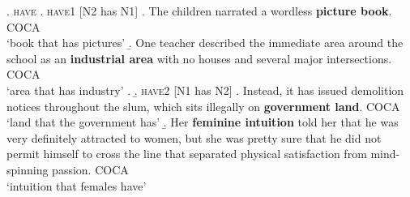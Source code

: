 \ex. \textsc{have}
\a. \textsc{have1} [N2 has N1]
\a. \label{ex:picture_book}%
 The children narrated a wordless \textbf{picture book}. COCA
\\ `book that has pictures'
\b. \label{ex:industrial_area }%
One teacher described the immediate area around the school as an \textbf{industrial
area} with no houses and several major intersections. COCA
\\`area that has industry'
\z.
\b. \textsc{have2} [N1 has N2]
\a. \label{ex:government_land}%
 Instead, it has issued demolition notices throughout the slum, which sits
 illegally on \textbf{government land}. COCA
\\
`land that the government has'
\b. \label{ex:feminine_intuition}%
Her \textbf{feminine intuition} told her that he was very definitely attracted to
women, but she was pretty sure that he did not permit himself to cross the
line that separated physical satisfaction from mind-spinning passion. COCA
\\`intuition that females have'
\enlargethispage{1\baselineskip}

